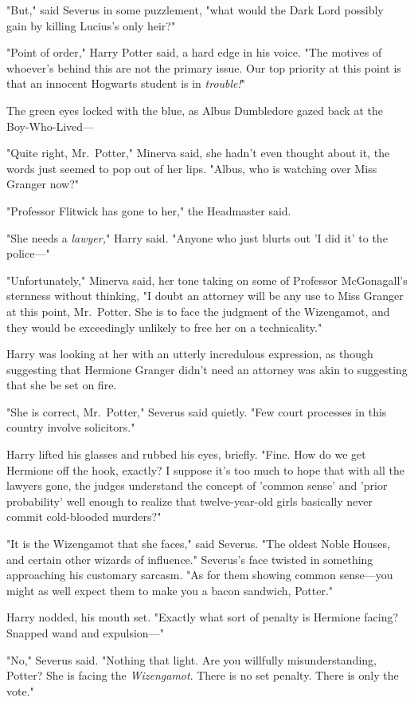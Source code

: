 "But," said Severus in some puzzlement, "what would the Dark Lord possibly gain by killing Lucius's only heir?"

"Point of order," Harry Potter said, a hard edge in his voice. "The motives of whoever's behind this are not the primary issue. Our top priority at this point is that an innocent Hogwarts student is in \emph{trouble!}"

The green eyes locked with the blue, as Albus Dumbledore gazed back at the Boy-Who-Lived---

"Quite right, Mr.~Potter," Minerva said, she hadn't even thought about it, the words just seemed to pop out of her lips. "Albus, who is watching over Miss Granger now?"

"Professor Flitwick has gone to her," the Headmaster said.

"She needs a \emph{lawyer,}" Harry said. "Anyone who just blurts out 'I did it' to the police---"

"Unfortunately," Minerva said, her tone taking on some of Professor McGonagall's sternness without thinking, "I doubt an attorney will be any use to Miss Granger at this point, Mr.~Potter. She is to face the judgment of the Wizengamot, and they would be exceedingly unlikely to free her on a technicality."

Harry was looking at her with an utterly incredulous expression, as though suggesting that Hermione Granger didn't need an attorney was akin to suggesting that she be set on fire.

"She is correct, Mr.~Potter," Severus said quietly. "Few court processes in this country involve solicitors."

Harry lifted his glasses and rubbed his eyes, briefly. "Fine. How do we get Hermione off the hook, exactly? I suppose it's too much to hope that with all the lawyers gone, the judges understand the concept of 'common sense' and 'prior probability' well enough to realize that twelve-year-old girls basically never commit cold-blooded murders?"

"It is the Wizengamot that she faces," said Severus. "The oldest Noble Houses, and certain other wizards of influence." Severus's face twisted in something approaching his customary sarcasm. "As for them showing common sense---you might as well expect them to make you a bacon sandwich, Potter."

Harry nodded, his mouth set. "Exactly what sort of penalty is Hermione facing? Snapped wand and expulsion---"

"No," Severus said. "Nothing that light. Are you willfully misunderstanding, Potter? She is facing the \emph{Wizengamot}. There is no set penalty. There is only the vote."

